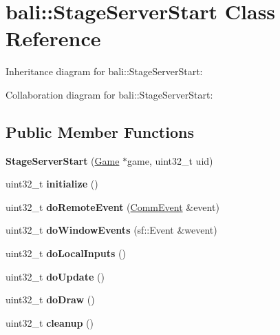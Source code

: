 \hypertarget{classbali_1_1_stage_server_start}{\section{bali\-:\-:Stage\-Server\-Start Class Reference}
\label{classbali_1_1_stage_server_start}
}


Inheritance diagram for bali\-:\-:Stage\-Server\-Start\-:


Collaboration diagram for bali\-:\-:Stage\-Server\-Start\-:
\subsection*{Public Member Functions}
\begin{DoxyCompactItemize}
\item 
\hypertarget{classbali_1_1_stage_server_start_a897e477ccae8269ef89a2721b33eb5f1}{{\bfseries Stage\-Server\-Start} (\hyperlink{classbali_1_1_game}{Game} $\ast$game, uint32\-\_\-t uid)}\label{classbali_1_1_stage_server_start_a897e477ccae8269ef89a2721b33eb5f1}

\item 
\hypertarget{classbali_1_1_stage_server_start_a3bb8fbc584a8f507f5f56a96b13eec5c}{uint32\-\_\-t {\bfseries initialize} ()}\label{classbali_1_1_stage_server_start_a3bb8fbc584a8f507f5f56a96b13eec5c}

\item 
\hypertarget{classbali_1_1_stage_server_start_a1312d4d92afa0c5894243d072d723603}{uint32\-\_\-t {\bfseries do\-Remote\-Event} (\hyperlink{classbali_1_1_comm_event}{Comm\-Event} \&event)}\label{classbali_1_1_stage_server_start_a1312d4d92afa0c5894243d072d723603}

\item 
\hypertarget{classbali_1_1_stage_server_start_a5bf37b73caeb487a7e20ad8526c021d4}{uint32\-\_\-t {\bfseries do\-Window\-Events} (sf\-::\-Event \&wevent)}\label{classbali_1_1_stage_server_start_a5bf37b73caeb487a7e20ad8526c021d4}

\item 
\hypertarget{classbali_1_1_stage_server_start_aa72760119ff13512f30992af4239802e}{uint32\-\_\-t {\bfseries do\-Local\-Inputs} ()}\label{classbali_1_1_stage_server_start_aa72760119ff13512f30992af4239802e}

\item 
\hypertarget{classbali_1_1_stage_server_start_a8286e96ae499e5ea6289dcaeab0cfd74}{uint32\-\_\-t {\bfseries do\-Update} ()}\label{classbali_1_1_stage_server_start_a8286e96ae499e5ea6289dcaeab0cfd74}

\item 
\hypertarget{classbali_1_1_stage_server_start_a910cad5227a40ace296b4b6bb14e53ad}{uint32\-\_\-t {\bfseries do\-Draw} ()}\label{classbali_1_1_stage_server_start_a910cad5227a40ace296b4b6bb14e53ad}

\item 
\hypertarget{classbali_1_1_stage_server_start_a9b5ff0f7324f6919786ceb2d581a395c}{uint32\-\_\-t {\bfseries cleanup} ()}\label{classbali_1_1_stage_server_start_a9b5ff0f7324f6919786ceb2d581a395c}

\end{DoxyCompactItemize}
